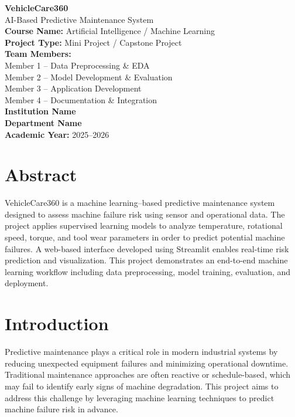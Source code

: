 \documentclass[12pt,a4paper]{article}
\begin{document}
\begin{titlepage}
    \centering
    \vspace*{2cm}

    {\LARGE \textbf{VehicleCare360}}\\[0.5cm]
    {\large AI-Based Predictive Maintenance System}\\[1.5cm]

    \textbf{Course Name:} Artificial Intelligence / Machine Learning\\
    \textbf{Project Type:} Mini Project / Capstone Project\\[1cm]

    \textbf{Team Members:}\\
    Member 1 – Data Preprocessing \& EDA\\
    Member 2 – Model Development \& Evaluation\\
    Member 3 – Application Development\\
    Member 4 – Documentation \& Integration\\[1.5cm]

    \textbf{Institution Name}\\
    \textbf{Department Name}\\
    \textbf{Academic Year:} 2025–2026

    \vfill
\end{titlepage}

\section*{Abstract}
VehicleCare360 is a machine learning–based predictive maintenance system designed to assess machine failure risk using sensor and operational data. The project applies supervised learning models to analyze temperature, rotational speed, torque, and tool wear parameters in order to predict potential machine failures. A web-based interface developed using Streamlit enables real-time risk prediction and visualization. This project demonstrates an end-to-end machine learning workflow including data preprocessing, model training, evaluation, and deployment.

\section{Introduction}
Predictive maintenance plays a critical role in modern industrial systems by reducing unexpected equipment failures and minimizing operational downtime. Traditional maintenance approaches are often reactive or schedule-based, which may fail to identify early signs of machine degradation. This project aims to address this challenge by leveraging machine learning techniques to predict machine failure risk in advance.
\end{document}
